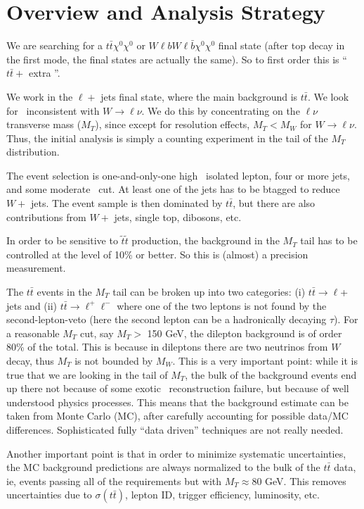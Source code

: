 \section{Overview and Analysis Strategy}
\label{sec:overview}

We are searching for a $t\bar{t}\chi^0\chi^0$ or $W \ell b W \ell \bar{b} \chi^0 \chi^0$ final state
(after top decay in the first mode, the final states are actually the same).  So to first order 
this is ``$t\bar{t} +$ extra \met''.  

We work in the $\ell +$ jets final state, where the main background is $t\bar{t}$.  We look for 
\met\ inconsistent with $W \to \ell \nu$.  We do this by concentrating on the $\ell \nu$ transverse
mass ($M_T$), since except for resolution effects, $M_T < M_W$ for $W \to \ell \nu$.  Thus, the
initial analysis is simply a counting experiment in the tail of the $M_T$ distribution.  

The event selection is one-and-only-one high \pt\ isolated lepton, four or more jets, and
some moderate \met\ cut.  At least one of the jets has to be btagged to reduce $W+$ jets.
The event sample is then dominated by $t\bar{t}$, but there are also contributions from $W+$ jets,
single top, dibosons, etc.

In order to be sensitive to $\widetilde{t}\widetilde{t}$ production, the background in the $M_T$
tail has to be controlled at the level of 10\% or better. So this is (almost) a precision measurement.

The $t\bar{t}$ events in the $M_T$ tail can be broken up into two categories: 
(i) $t\bar{t} \to \ell $+ jets and (ii) $t\bar{t} \to \ell^+ \ell^-$ where one of the two
leptons is not found by the second-lepton-veto (here the second lepton can be a hadronically
decaying $\tau$).
 For a reasonable $M_T$ cut, say $M_T >$ 150 GeV, the dilepton background is of order 80\% of 
the total.  This is because in dileptons there are two neutrinos from $W$ decay, thus $M_T$
is not bounded by $M_W$.  This is a very important point: while it is true that we are looking in
the tail of $M_T$, the bulk of the background events end up there not because of some exotic
\met\ reconstruction failure, but because of well understood physics processes.  This means that 
the background estimate can be taken from Monte Carlo (MC), after carefully accounting for possible
data/MC differences.  Sophisticated fully ``data driven'' techniques are not really needed.

Another important point is that in order to minimize systematic uncertainties, the MC background
predictions are always normalized to the bulk of the $t\bar{t}$ data, ie, events passing all of the 
requirements but with $M_T \approx 80$ GeV.
This removes uncertainties
due to $\sigma(t\bar{t})$, lepton ID, trigger efficiency, luminosity, etc.   

